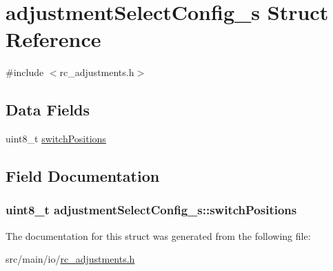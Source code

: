 \hypertarget{structadjustmentSelectConfig__s}{\section{adjustment\+Select\+Config\+\_\+s Struct Reference}
\label{structadjustmentSelectConfig__s}
}


{\ttfamily \#include $<$rc\+\_\+adjustments.\+h$>$}

\subsection*{Data Fields}
\begin{DoxyCompactItemize}
\item 
uint8\+\_\+t \hyperlink{structadjustmentSelectConfig__s_a06abf669a6c481371b25fcc782a3781a}{switch\+Positions}
\end{DoxyCompactItemize}


\subsection{Field Documentation}
\hypertarget{structadjustmentSelectConfig__s_a06abf669a6c481371b25fcc782a3781a}{
\subsubsection[{switch\+Positions}]{\setlength{\rightskip}{0pt plus 5cm}uint8\+\_\+t adjustment\+Select\+Config\+\_\+s\+::switch\+Positions}}\label{structadjustmentSelectConfig__s_a06abf669a6c481371b25fcc782a3781a}


The documentation for this struct was generated from the following file\+:\begin{DoxyCompactItemize}
\item 
src/main/io/\hyperlink{io_2rc__adjustments_8h}{rc\+\_\+adjustments.\+h}\end{DoxyCompactItemize}
